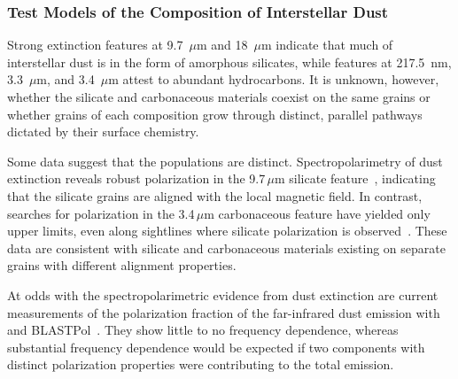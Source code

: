 \documentclass[PICOReport.tex]{subfiles}
\begin{document}
\subsubsection{Test Models of the Composition of Interstellar Dust}
\label{sec:test_composition_models}

Strong extinction features at 9.7~$\mu$m and 18~$\mu$m indicate that much of interstellar dust is in the form of amorphous silicates, while features at 217.5~nm, 3.3~$\mu$m, and 3.4~$\mu$m attest to abundant hydrocarbons. It is unknown, however, whether the silicate and carbonaceous materials coexist on the same grains or whether grains of each composition grow through distinct, parallel pathways dictated by their surface chemistry. 


Some data suggest that the populations are distinct. Spectropolarimetry of dust extinction reveals robust polarization in the 9.7\,$\mu$m silicate feature~\citep{Smith2000}, indicating that the silicate grains are aligned with the local magnetic field. In contrast, searches for polarization in the 3.4\,$\mu$m carbonaceous feature have yielded only upper limits, even along sightlines where silicate polarization is observed~\citep{Chiar2006,Mason2007}. These data are consistent with silicate and carbonaceous materials existing on separate grains with different alignment properties. 


At odds with the spectropolarimetric evidence from dust extinction are current measurements of the polarization fraction of the far-infrared dust emission with \planck~\citep{Planck_Int_XXII} and BLASTPol~\citep{Ashton2018}. They show little to no frequency dependence, whereas substantial frequency dependence would be expected if two components with distinct polarization properties were contributing to the total emission. 
\end{document}
